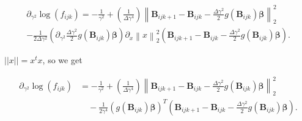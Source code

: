 \begin{align*}
\partial_{\gamma^2} \log(f_{ijk})  = -\frac{1}{\gamma^2} +( \frac{1}{\Delta \gamma^4})\left\lVert \textbf{B}_{ijk+1} - \textbf{B}_{ijk} - \frac{\Delta\gamma^2}{2} g(\textbf{B}_{ijk})\bm \beta \right\rVert_2^2 \\ -  \frac{1}{2\Delta \gamma^2} (\partial_{\gamma^2} \frac{\Delta\gamma^2}{2} g(\textbf{B}_{ijk})\bm \beta) \partial_x \left\lVert x\right\rVert_2^2 (\textbf{B}_{ijk+1} - \textbf{B}_{ijk} - \frac{\Delta\gamma^2}{2} g(\textbf{B}_{ijk})\bm \beta ).
\end{align*}


$||x|| = x^tx$, so we get

\begin{align*}
\partial_{\gamma^2} \log(f_{ijk}) 
&= -\frac{1}{\gamma^2} 
+ \left( \frac{1}{\Delta \gamma^4} \right)
\left\lVert 
\textbf{B}_{ijk+1} - \textbf{B}_{ijk} 
- \frac{\Delta \gamma^2}{2} g(\textbf{B}_{ijk}) \bm{\beta}
\right\rVert_2^2 \\
&\quad - \frac{1}{2\gamma^4} 
\left( g(\textbf{B}_{ijk}) \bm{\beta} \right)^T 
\left( \textbf{B}_{ijk+1} - \textbf{B}_{ijk} 
- \frac{\Delta \gamma^2}{2} g(\textbf{B}_{ijk}) \bm{\beta} \right).
\end{align*}


